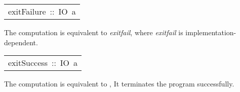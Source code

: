 \begin{haddockdesc}
\item[\begin{tabular}{@{}l}
exitFailure\ ::\ IO\ a
\end{tabular}]\haddockbegindoc
The computation  is equivalent to
  \haddocktt{(} \emph{exitfail}\haddocktt{)},
 where \emph{exitfail} is implementation-dependent.
\par

\end{haddockdesc}
\begin{haddockdesc}
\item[\begin{tabular}{@{}l}
exitSuccess\ ::\ IO\ a
\end{tabular}]\haddockbegindoc
The computation  is equivalent to
  , It terminates the program
 successfully.
\par

\end{haddockdesc}